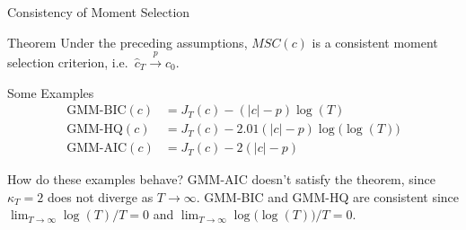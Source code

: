 \begin{frame}{Consistency of Moment Selection}

  \small
\begin{alertblock}{Theorem}
	Under the preceding assumptions, $MSC(c)$ is a consistent moment selection criterion, i.e.\ $\widehat{c}_T \overset{p}{\rightarrow} c_0$.
\end{alertblock}

\begin{block}{Some Examples}
  \vspace{-1em}
  \begin{align*}
    \mbox{GMM-BIC}(c) &= J_T(c) - \left( |c|-p \right)\log(T)\\
    \mbox{GMM-HQ}(c) &= J_T(c) - 2.01\left( |c|-p \right)\log\big(\log(T)\big)\\
    \mbox{GMM-AIC}(c) &= J_T(c) - 2\left( |c|-p \right)
  \end{align*}
\end{block}

\begin{alertblock}{How do these examples behave?}
  GMM-AIC doesn't satisfy the theorem, since $\kappa_T = 2$ does not diverge as $T\rightarrow \infty$.
  GMM-BIC and GMM-HQ are consistent since $\lim_{T\rightarrow \infty} \log(T)/T =0$ and $\lim_{T\rightarrow \infty} \log\big(\log(T)\big)/T = 0$.
\end{alertblock}

\end{frame}

